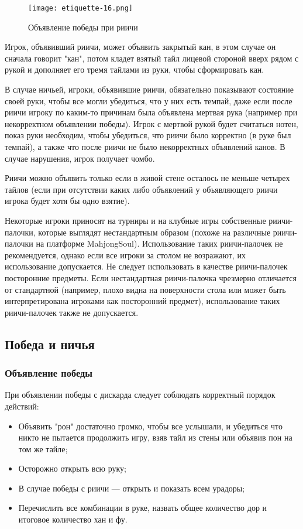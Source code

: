 \begin{figure}[H]
	\centering
	\texttt{[image: etiquette-16.png]}
	\caption{Объявление победы при риичи}
\end{figure}

Игрок, объявивший риичи, может объявить закрытый кан, в этом случае он сначала говорит "кан", потом кладет взятый тайл лицевой стороной вверх рядом с рукой и дополняет его тремя тайлами из руки, чтобы сформировать кан.

В случае ничьей, игроки, объявившие риичи, обязательно показывают состояние своей руки, чтобы все могли убедиться, что у них есть темпай, даже если после риичи игроку по каким-то причинам была объявлена мертвая рука (например при некорректном объявлении победы). Игрок с мертвой рукой будет считаться нотен, показ руки необходим, чтобы убедиться, что риичи было корректно (в руке был темпай), а также что после риичи не было некорректных объявлений канов. В случае нарушения, игрок получает чомбо.

Риичи можно объявить только если в живой стене осталось не меньше четырех тайлов (если при отсутствии каких либо объявлений у объявляющего риичи игрока будет хотя бы одно взятие). 

Некоторые игроки приносят на турниры и на клубные игры собственные риичи-палочки, которые выглядят нестандартным образом (похоже на различные риичи-палочки на платформе MahjongSoul). Использование таких риичи-палочек не рекомендуется, однако если все игроки за столом не возражают, их использование допускается. Не следует использовать в качестве риичи-палочек посторонние предметы. Если нестандартная риичи-палочка чрезмерно отличается от стандартной (например, плохо видна на поверхности стола или может быть интерпретирована игроками как посторонний предмет), использование таких риичи-палочек также не допускается.

\subsection{Победа и ничья}

\subsubsection{Объявление победы}

При объявлении победы с дискарда следует соблюдать корректный порядок действий:

\begin{itemize}
	\item Объявить "рон" достаточно громко, чтобы все услышали, и убедиться что никто не пытается продолжить игру, взяв тайл из стены или объявив пон на том же тайле;
	\item Осторожно открыть всю руку;
	\item В случае победы с риичи --- открыть и показать всем урадоры;
	\item Перечислить все комбинации в руке, назвать общее количество дор и итоговое количество хан и фу.
\end{itemize}

